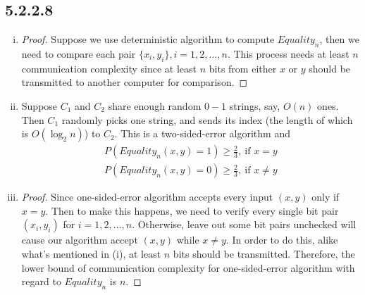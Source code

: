 \documentclass[twocolumn]{article}
\begin{document}
	\subsection*{5.2.2.8}
	\begin{enumerate}[(i)]
		\item 
		\begin{proof}
			Suppose we use deterministic algorithm to compute $Equality_n$, then we need to compare each pair $\{x_i,y_i\},i=1,2,\dots,n$. This process needs at least $n$ communication complexity since at least $n$ bits from either $x$ or $y$ should be transmitted to another computer for comparison.
		\end{proof}
		\item 
		Suppose $C_1$ and $C_2$ share enough random $0-1$ strings, say, $O(n)$ ones. Then $C_1$ randomly picks one string, and sends its index (the length of which is $O(\log_2n)$) to $C_2$. This is a two-sided-error algorithm and
		\[
		\begin{aligned}
			P(Equality_n(x,y)=1)\ge\frac{2}{3},\ \text{if $x=y$}\\
			P(Equality_n(x,y)=0)\ge\frac{2}{3},\ \text{if $x\neq y$}
		\end{aligned}
		\]
		\item 
		\begin{proof}
			Since one-sided-error algorithm accepts every input $(x,y)$ only if $x= y$. Then to make this happens, we need to verify every single bit pair $(x_i,y_i)$ for $i=1,2,\dots,n$. Otherwise, leave out some bit pairs unchecked will cause our algorithm accept $(x,y)$ while $x\neq y$. In order to do this, alike what's mentioned in (i), at least $n$ bits should be transmitted. Therefore, the lower bound of communication complexity for one-sided-error algorithm with regard to $Equality_n$ is $n$.
		\end{proof}
	\end{enumerate}
\end{document}
